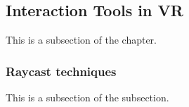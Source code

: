 \subsection{Interaction Tools in VR}
This is a subsection of the chapter.

\subsubsection{Raycast techniques}
This is a subsection of the subsection.
